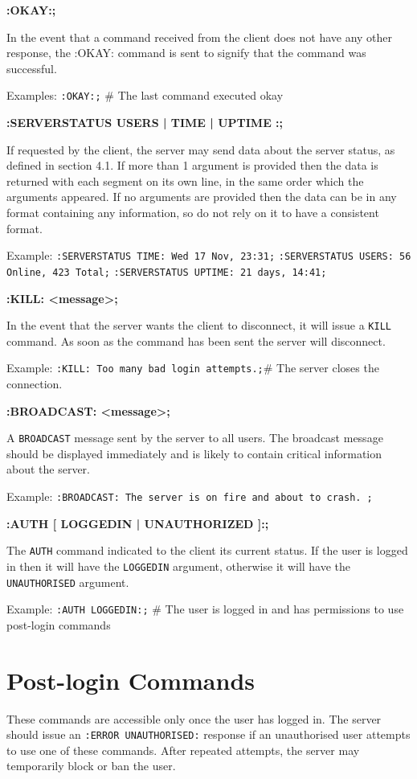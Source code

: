 {\bf :OKAY:;}

In the event that a command received from the client does not have any other response, the :OKAY: command is sent to signify that the command was successful. 

Examples:
\texttt{:OKAY:;}					# The last command executed okay

{\bf :SERVERSTATUS { USERS | TIME | UPTIME }:;}

If requested by the client, the server may send data about the server status, as defined in section 4.1. If more than 1 argument is provided then the data is returned with each segment on its own line, in the same order which the arguments appeared. If no arguments are provided then the data can be in any format containing any information, so do not rely on it to have a consistent format.

Example:
\texttt{:SERVERSTATUS TIME: Wed 17 Nov, 23:31;}
\texttt{:SERVERSTATUS USERS: 56 Online, 423 Total;}
\texttt{:SERVERSTATUS UPTIME: 21 days, 14:41;}

{\bf :KILL: <message>;}

In the event that the server wants the client to disconnect, it will issue a \texttt{KILL} command. As soon as the command has been sent the server will disconnect. 

Example:
\texttt{:KILL: Too many bad login attempts.;}# The server closes the connection.

{\bf :BROADCAST: <message>;}

A \texttt{BROADCAST} message sent by the server to all users. The broadcast message should be displayed immediately and is likely to contain critical information about the server.

Example:
\texttt{:BROADCAST: The server is on fire and about to crash. ;}

{\bf :AUTH [ LOGGEDIN | UNAUTHORIZED ]:;}

The \texttt{AUTH} command indicated to the client its current status. If the user is logged in then it will have the \texttt{LOGGEDIN} argument, otherwise it will have the \texttt{UNAUTHORISED} argument.

Example:
\texttt{:AUTH LOGGEDIN:;}	# The user is logged in and has permissions to use post-login commands

\section{Post-login Commands}

These commands are accessible only once the user has logged in. The server should issue an \texttt{:ERROR UNAUTHORISED:} response if an unauthorised user attempts to use one of these commands. After repeated attempts, the server may temporarily block or ban the user.

